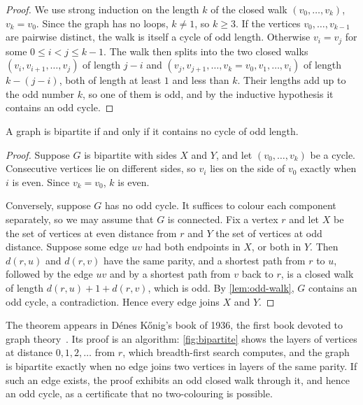 \begin{proof}
We use strong induction on the length $k$ of the closed walk $(v_0,\ldots,v_k)$, $v_k=v_0$. Since the graph has no loops, $k\ne1$, so $k\ge3$. If the vertices $v_0,\ldots,v_{k-1}$ are pairwise distinct, the walk is itself a cycle of odd length. Otherwise $v_i=v_j$ for some $0\le i<j\le k-1$. The walk then splits into the two closed walks $(v_i,v_{i+1},\ldots,v_j)$ of length $j-i$ and $(v_j,v_{j+1},\ldots,v_k=v_0,v_1,\ldots,v_i)$ of length $k-(j-i)$, both of length at least $1$ and less than $k$. Their lengths add up to the odd number $k$, so one of them is odd, and by the inductive hypothesis it contains an odd cycle.
\end{proof}

\begin{theorem}[K\H{o}nig]
\label{thm:bipartite}
A graph is bipartite if and only if it contains no cycle of odd length.
\end{theorem}

\begin{proof}
Suppose $G$ is bipartite with sides $X$ and $Y$, and let $(v_0,\ldots,v_k)$ be a cycle. Consecutive vertices lie on different sides, so $v_i$ lies on the side of $v_0$ exactly when $i$ is even. Since $v_k=v_0$, $k$ is even.

Conversely, suppose $G$ has no odd cycle. It suffices to colour each component separately, so we may assume that $G$ is connected. Fix a vertex $r$ and let $X$ be the set of vertices at even distance from $r$ and $Y$ the set of vertices at odd distance. Suppose some edge $uv$ had both endpoints in $X$, or both in $Y$. Then $d(r,u)$ and $d(r,v)$ have the same parity, and a shortest path from $r$ to $u$, followed by the edge $uv$ and by a shortest path from $v$ back to $r$, is a closed walk of length $d(r,u)+1+d(r,v)$, which is odd. By \cref{lem:odd-walk}, $G$ contains an odd cycle, a contradiction. Hence every edge joins $X$ and $Y$.
\end{proof}

The theorem appears in D\'enes K\H{o}nig's book of 1936, the first book devoted to graph theory~\cite{konig1936,biggs1976}. Its proof is an algorithm: \cref{fig:bipartite} shows the layers of vertices at distance $0,1,2,\ldots$ from $r$, which breadth-first search computes, and the graph is bipartite exactly when no edge joins two vertices in layers of the same parity. If such an edge exists, the proof exhibits an odd closed walk through it, and hence an odd cycle, as a certificate that no two-colouring is possible.

